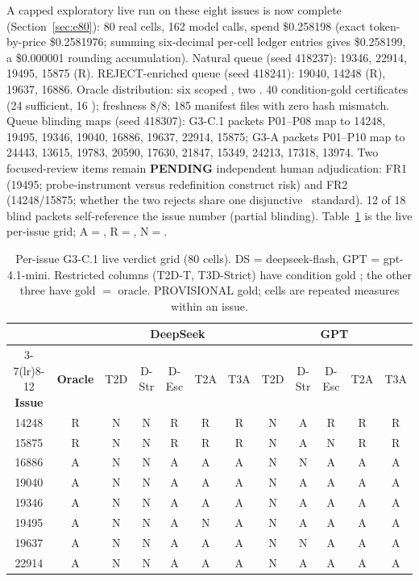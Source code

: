 A capped exploratory live run on these eight issues is now complete
(Section~\ref{sec:e80}): 80 real cells, 162 model calls, spend \$0.258198
(exact token-by-price \$0.2581976; summing six-decimal per-cell ledger
entries gives \$0.258199, a \$0.000001 rounding accumulation).
Natural queue (seed 418237): 19346, 22914, 19495, 15875 (R). REJECT-enriched
queue (seed 418241): 19040, 14248 (R), 19637, 16886. Oracle distribution: six
scoped \ACCEPT, two \REJECT. 40 condition-gold certificates (24 sufficient,
16 \NEED); freshness $8/8$; 185 manifest files with zero hash mismatch. Queue
blinding maps (seed 418307): G3-C.1 packets P01--P08 map to 14248, 19495,
19346, 19040, 16886, 19637, 22914, 15875; G3-A packets P01--P10 map to 24443,
13615, 19783, 20590, 17630, 21847, 15349, 24213, 17318, 13974. Two
focused-review items remain \textbf{PENDING} independent human adjudication:
FR1 (19495; probe-instrument versus redefinition construct risk) and FR2
(14248/15875; whether the two rejects share one disjunctive \REJECT\
standard). 12 of 18 blind packets self-reference the issue number (partial
blinding). Table~\ref{tab:t2} is the live per-issue grid; A$=$\ACCEPT,
R$=$\REJECT, N$=$\NEED.

\begin{table}[h]
\centering
\scriptsize
\setlength{\tabcolsep}{3.2pt}
\caption{Per-issue G3-C.1 live verdict grid (80 cells). DS =
deepseek-flash, GPT = gpt-4.1-mini. Restricted columns (T2D-T, T3D-Strict)
have condition gold \NEED; the other three have gold $=$ oracle. PROVISIONAL
gold; cells are repeated measures within an issue.}
\label{tab:t2}
\begin{tabular}{c c ccccc ccccc}
\toprule
 & & \multicolumn{5}{c}{\textbf{DeepSeek}} & \multicolumn{5}{c}{\textbf{GPT}} \\
\cmidrule(lr){3-7}\cmidrule(lr){8-12}
\textbf{Issue} & \textbf{Oracle} & T2D & D-Str & D-Esc & T2A & T3A & T2D & D-Str & D-Esc & T2A & T3A \\
\midrule
14248 & R & N & N & R & R & R & N & A & R & R & R \\
15875 & R & N & N & R & R & R & N & A & N & R & R \\
16886 & A & N & N & A & A & A & N & N & A & A & A \\
19040 & A & N & N & A & A & A & N & A & A & A & A \\
19346 & A & N & N & A & A & A & N & A & A & A & A \\
19495 & A & N & N & A & N & A & N & A & A & A & A \\
19637 & A & N & N & A & A & A & N & N & A & A & A \\
22914 & A & N & N & A & A & A & N & A & A & A & A \\
\bottomrule
\end{tabular}
\end{table}

